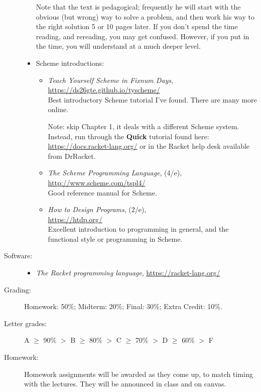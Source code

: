 \documentclass{article}
\newcommand{\myitem}[1]{\item[#1]}
\begin{document}
\begin{description}
\begin{itemize}
Note that the text is pedagogical; frequently he will start
with the obvious (but wrong) way to solve a problem, and then work his
way to the right solution 5 or 10 pages later.  If you don't spend the
time reading, and rereading, you may get confused.  However, if you
put in the time, you will understand at a much deeper level.

\item Scheme introductions:
\begin{itemize}

\item {\em Teach Yourself Scheme in Fixnum Days}, \\
\url{https://ds26gte.github.io/tyscheme/}\\
Best introductory Scheme tutorial I've found.  There are many
more online.

Note: skip Chapter 1, it deals with a different Scheme system.
Instead, run through the {\bf Quick} tutorial found
here: \url{https://docs.racket-lang.org/} or in
the Racket help desk available from DrRacket.

\item {\em The Scheme Programming Language}, (4/e),\\
\url{http://www.scheme.com/tspl4/}\\
Good reference manual for Scheme.

\item {\em How to Design Programs}, (2/e),\\
\url{https://htdp.org/}\\
Excellent introduction to programming in general, and the
functional style or programming in Scheme.

\end{itemize}
\end{itemize}

\myitem{Software:} 
\begin{itemize}
\item {\em The Racket programming language}, 
\url{https://racket-lang.org/}
\end{itemize}

\myitem{Grading:}
Homework: 50\%; Midterm: 20\%; Final: 30\%; Extra Credit: 10\%.

\item[Letter grades:]
A $\ge$ 90\% $>$ B $\ge$ 80\% $>$ C $\ge$ 70\% $>$ D $\ge$ 60\% $>$ F

\item[Homework:]  Homework assignments will be awarded as they
come up, to match timing with the lectures.  They will be announced
in class and on canvas.


\end{description}
\end{document}
